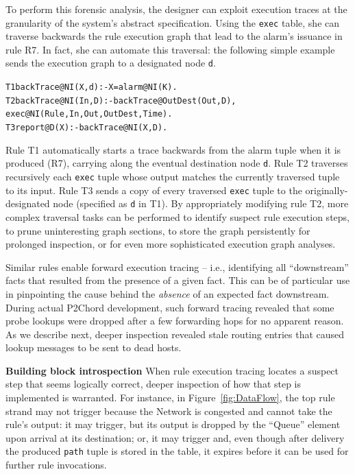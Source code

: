 \documentclass[10pt,twocolumn]{article}
\newenvironment{overlog}{\begin{alltt}\footnotesize}{\end{alltt}}
\newcommand{\ol}[1]{{\tt\footnotesize#1}}
\begin{document}
To perform this forensic analysis, the designer can exploit execution
traces at the granularity of the system's abstract specification.  Using
the \ol{exec} table, she can traverse backwards the
rule execution graph that lead to the alarm's issuance in rule R7. In
fact, she can automate this traversal: the following simple example
sends the execution graph
to a designated node \ol{d}.
\begin{overlog}
T1 backTrace@NI(X,d) :- X=alarm@NI(K).
T2 backTrace@NI(In,D) :- backTrace@OutDest(Out,D),
     exec@NI(Rule,In,Out,OutDest,Time).
T3 report@D(X) :- backTrace@NI(X,D).
\end{overlog}
Rule T1 automatically starts a trace backwards from the alarm tuple when
it is produced (R7), carrying along the eventual destination node
\ol{d}.  Rule T2 traverses recursively each 
\ol{exec} tuple whose output matches the currently traversed tuple to
its input.  Rule T3 sends a copy of every traversed \ol{exec} tuple to
the originally-designated node (specified as \ol{d} in T1).  By appropriately modifying rule T2, more
complex traversal tasks can be performed to identify suspect rule
execution steps, to prune uninteresting graph sections, to store the
graph persistently for prolonged inspection, or for even more
sophisticated execution graph analyses.

Similar rules enable forward execution tracing -- i.e., identifying
all ``downstream'' facts that resulted from the presence of a given
fact. This can be of particular use in pinpointing the cause behind
the {\em absence} of an expected fact downstream.  During actual
P2Chord development, such forward tracing revealed that some probe
lookups were dropped after a few forwarding hops for no apparent
reason. As we describe next, deeper inspection revealed stale routing
entries that caused lookup messages to be sent to dead hosts.




{\bf Building block introspection}
When rule execution tracing locates a suspect step that seems
logically correct, deeper inspection of how that step is implemented
is warranted. For instance, in Figure~\ref{fig:DataFlow}, the top rule
strand may not trigger because the Network is congested and cannot
take the rule's output: it may trigger, but its output is dropped by
the ``Queue'' element upon arrival at its destination; or, it may
trigger and, even though after delivery the produced \ol{path} tuple
is stored in the table, it expires before it can be used for further
rule invocations.
\end{document}
